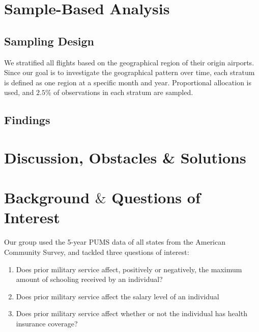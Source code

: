 \documentclass{article}
\begin{document}
\section{Sample-Based Analysis}
\subsection{Sampling Design}
We stratified all flights based on the geographical region of their origin airports. Since our goal is to investigate the geographical pattern over time, each stratum is defined as one region at a specific month and year. Proportional allocation is used, and $2.5\%$ of observations in each stratum are sampled.


\subsection{Findings}


\section{Discussion, Obstacles \& Solutions}
















\section{Background $\&$ Questions of Interest}
Our group used the 5-year PUMS data of all states from the American Community Survey, and tackled three questions of interest:

\begin{enumerate}

\item Does prior military service affect, positively or negatively, the maximum amount of schooling received by an individual? %
\item Does prior military service affect the salary level of an individual
\item Does prior military service affect whether or not the individual has health insurance coverage? 
\end{enumerate}
\end{document}
